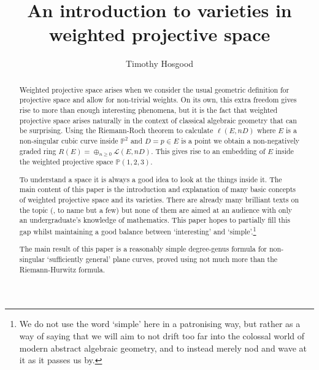 \documentclass[10pt,notitlepage]{article}
\makeatletter
\newcommand{\draftwatermarkoff}{%
  \let\sc@watermark\@empty
}
\numberwithin{equation}{subsection}
\newcommand{\pee}{\mathbb{P}}
\makeatother
\begin{document}
\draftwatermarkoff

    
    \author{Timothy Hosgood}
    \title{An introduction to varieties in weighted projective space}
    \maketitle


    \begin{abstract}
        Weighted projective space arises when we consider the usual geometric definition for projective space and allow for non-trivial weights.
        On its own, this extra freedom gives rise to more than enough interesting phenomena, but it is the fact that weighted projective space arises naturally in the context of classical algebraic geometry that can be surprising.
        Using the Riemann-Roch theorem to calculate $\ell(E,nD)$ where $E$ is a non-singular cubic curve inside $\pee^2$ and $D=p\in E$ is a point we obtain a non-negatively graded ring $R(E)=\oplus_{n\geqslant0}\mathcal{L}(E,nD)$.
        This gives rise to an embedding of $E$ inside the weighted projective space $\pee(1,2,3)$.

        To understand a space it is always a good idea to look at the things inside it.
        The main content of this paper is the introduction and explanation of many basic concepts of weighted projective space and its varieties.
        There are already many brilliant texts on the topic (\cite{Reid:2002uy,IanoFletcher:2015wc}, to name but a few) but none of them are aimed at an audience with only an undergraduate's knowledge of mathematics.
        This paper hopes to partially fill this gap whilst maintaining a good balance between `interesting' and `simple'.\footnote{%
            We do not use the word `simple' here in a patronising way, but rather as a way of saying that we will aim to not drift too far into the colossal world of modern abstract algebraic geometry, and to instead merely nod and wave at it as it passes us by.
        }

        The main result of this paper is a reasonably simple degree-genus formula for non-singular `sufficiently general' plane curves, proved using not much more than the Riemann-Hurwitz formula.
    \end{abstract}


    \vspace{-3em}
    \tableofcontents
\end{document}

